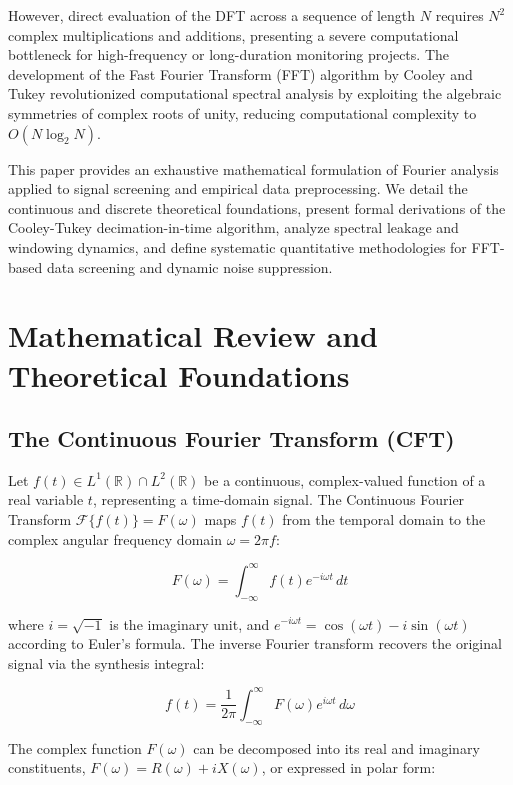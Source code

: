 \documentclass[11pt,a4paper]{article}
\begin{document}
However, direct evaluation of the DFT across a sequence of length $N$ requires $N^2$ complex multiplications and additions, presenting a severe computational bottleneck for high-frequency or long-duration monitoring projects. The development of the Fast Fourier Transform (FFT) algorithm by Cooley and Tukey revolutionized computational spectral analysis by exploiting the algebraic symmetries of complex roots of unity, reducing computational complexity to $O(N \log_2 N)$.

This paper provides an exhaustive mathematical formulation of Fourier analysis applied to signal screening and empirical data preprocessing. We detail the continuous and discrete theoretical foundations, present formal derivations of the Cooley-Tukey decimation-in-time algorithm, analyze spectral leakage and windowing dynamics, and define systematic quantitative methodologies for FFT-based data screening and dynamic noise suppression.

\section{Mathematical Review and Theoretical Foundations}

\subsection{The Continuous Fourier Transform (CFT)}

Let $f(t) \in L^1(\mathbb{R}) \cap L^2(\mathbb{R})$ be a continuous, complex-valued function of a real variable $t$, representing a time-domain signal. The Continuous Fourier Transform $\mathcal{F}\{f(t)\} = F(\omega)$ maps $f(t)$ from the temporal domain to the complex angular frequency domain $\omega = 2\pi f$:

\begin{equation}
F(\omega) = \int_{-\infty}^{\infty} f(t) e^{-i \omega t} \, dt
\end{equation}

where $i = \sqrt{-1}$ is the imaginary unit, and $e^{-i \omega t} = \cos(\omega t) - i \sin(\omega t)$ according to Euler's formula. The inverse Fourier transform recovers the original signal via the synthesis integral:

\begin{equation}
f(t) = \frac{1}{2\pi} \int_{-\infty}^{\infty} F(\omega) e^{i \omega t} \, d\omega
\end{equation}

The complex function $F(\omega)$ can be decomposed into its real and imaginary constituents, $F(\omega) = R(\omega) + i X(\omega)$, or expressed in polar form:
\end{document}
